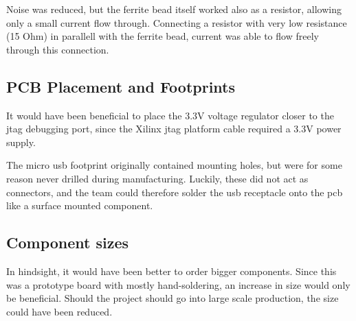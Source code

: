 Noise was reduced, but the ferrite bead itself worked also as a resistor, allowing only a small current flow through. 
Connecting a resistor with very low resistance (15 Ohm) in parallell with the ferrite bead, current was able to flow freely through this connection.

\subsection{PCB Placement and Footprints}
It would have been beneficial to place the 3.3V voltage regulator closer to the \gls{jtag} debugging port, since the Xilinx \gls{jtag} platform cable required a 3.3V power supply.

The micro \gls{usb} footprint originally contained mounting holes, but were for some reason never drilled during manufacturing. 
Luckily, these did not act as connectors, and the team could therefore solder the \gls{usb} receptacle onto the \gls{pcb} like a surface mounted component.

\subsection{Component sizes}
In hindsight, it would have been better to order bigger components. 
Since this was a prototype board with mostly hand-soldering, an increase in size would only be beneficial. 
Should the project should go into large scale production, the size could have been reduced.
